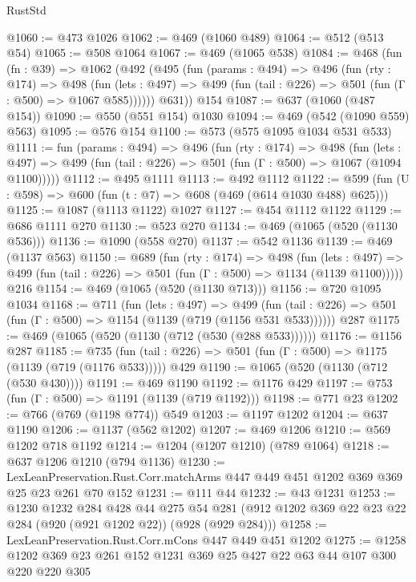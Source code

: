 \begin{lexlean}{RustStd}
\begin{coremodule}
@1060 := @473 @1026
@1062 := @469 (@1060 @489)
@1064 := @512 (@513 @54)
@1065 := @508 @1064
@1067 := @469 (@1065 @538)
@1084 := @468
    (fun (fn : @39) =>
    @1062
      (@492
        (@495
          (fun (params : @494) =>
          @496
            (fun (rty : @174) =>
            @498
              (fun (lets : @497) =>
              @499 (fun (tail : @226) => @501 (fun (Γ : @500) => @1067 @585))))))
        @631))
    @154
@1087 := @637 (@1060 (@487 @154))
@1090 := @550 (@551 @154) @1030
@1094 := @469 (@542 (@1090 @559) @563)
@1095 := @576 @154
@1100 := @573 (@575 @1095 @1034 @531 @533)
@1111 := fun (params : @494) =>
  @496
    (fun (rty : @174) =>
    @498
      (fun (lets : @497) =>
      @499 (fun (tail : @226) => @501 (fun (Γ : @500) => @1067 (@1094 @1100)))))
@1112 := @495 @1111
@1113 := @492 @1112
@1122 := @599 (fun (U : @598) => @600 (fun (t : @7) => @608 (@469 (@614 @1030 @488) @625)))
@1125 := @1087 (@1113 @1122) @1027
@1127 := @454 @1112 @1122
@1129 := @686 @1111 @270
@1130 := @523 @270
@1134 := @469 (@1065 (@520 (@1130 @536)))
@1136 := @1090 (@558 @270)
@1137 := @542 @1136
@1139 := @469 (@1137 @563)
@1150 := @689
    (fun (rty : @174) =>
    @498
      (fun (lets : @497) =>
      @499 (fun (tail : @226) => @501 (fun (Γ : @500) => @1134 (@1139 @1100)))))
    @216
@1154 := @469 (@1065 (@520 (@1130 @713)))
@1156 := @720 @1095 @1034
@1168 := @711
    (fun (lets : @497) =>
    @499 (fun (tail : @226) => @501 (fun (Γ : @500) => @1154 (@1139 (@719 (@1156 @531 @533))))))
    @287
@1175 := @469 (@1065 (@520 (@1130 (@712 (@530 (@288 @533))))))
@1176 := @1156 @287
@1185 := @735 (fun (tail : @226) => @501 (fun (Γ : @500) => @1175 (@1139 (@719 (@1176 @533))))) @429
@1190 := @1065 (@520 (@1130 (@712 (@530 @430))))
@1191 := @469 @1190
@1192 := @1176 @429
@1197 := @753 (fun (Γ : @500) => @1191 (@1139 (@719 @1192)))
@1198 := @771 @23
@1202 := @766 (@769 (@1198 @774)) @549
@1203 := @1197 @1202
@1204 := @637 @1190
@1206 := @1137 (@562 @1202)
@1207 := @469 @1206
@1210 := @569 @1202 @718 @1192
@1214 := @1204 (@1207 @1210) (@789 @1064)
@1218 := @637 @1206 @1210 (@794 @1136)
@1230 := LexLeanPreservation.Rust.Corr.matchArms
    @447
    @449
    @451
    @1202
    @369
    @369
    @25
    @23
    @261
    @70
    @152
@1231 := @111 @44
@1232 := @43 @1231
@1253 := @1230
    @1232
    @284
    @428
    @44
    @275
    @54
    @281
    (@912 @1202 @369 @22 @23 @22 @284 (@920 (@921 @1202 @22)) (@928 (@929 @284)))
@1258 := LexLeanPreservation.Rust.Corr.mCons @447 @449 @451 @1202
@1275 := @1258 @1202 @369 @23 @261 @152 @1231 @369 @25 @427 @22 @63 @44 @107 @300 @220 @220 @305

\end{coremodule}
\end{lexlean}
